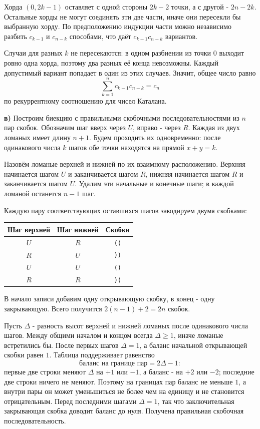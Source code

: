 \begin{problems}
\par Хорда $(0,2k-1)$ оставляет с одной стороны $2k-2$ точки, а с другой - $2n-2k$. Остальные хорды не могут соединять эти две части, иначе они пересекли бы выбранную хорду. По предположению индукции части можно независимо разбить $c_{k-1}$ и $c_{n-k}$ способами, что даёт $c_{k-1}c_{n-k}$ вариантов.
\par Случаи для разных $k$ не пересекаются: в одном разбиении из точки $0$ выходит ровно одна хорда, поэтому два разных её конца невозможны. Каждый допустимый вариант попадает в один из этих случаев. Значит, общее число равно
\[
\sum_{k=1}^{n}c_{k-1}c_{n-k}=c_n
\]
по рекуррентному соотношению для чисел Каталана.
\par\textbf{в)} Построим биекцию с правильными скобочными последовательностями из $n$ пар скобок. Обозначим шаг вверх через $U$, вправо - через $R$. Каждая из двух ломаных имеет длину $n+1$. Будем проходить их одновременно: после одинакового числа $k$ шагов обе точки находятся на прямой $x+y=k$.
\par Назовём ломаные верхней и нижней по их взаимному расположению. Верхняя начинается шагом $U$ и заканчивается шагом $R$, нижняя начинается шагом $R$ и заканчивается шагом $U$. Удалим эти начальные и конечные шаги; в каждой ломаной останется $n-1$ шаг.
\par Каждую пару соответствующих оставшихся шагов закодируем двумя скобками:
\begin{center}
\begin{tabular}{c|c|c}
Шаг верхней & Шаг нижней & Скобки\\\hline
$U$ & $R$ & \texttt{((}\\
$R$ & $U$ & \texttt{))}\\
$U$ & $U$ & \texttt{()}\\
$R$ & $R$ & \texttt{)(}
\end{tabular}
\end{center}
В начало записи добавим одну открывающую скобку, в конец - одну закрывающую. Всего получится $2(n-1)+2=2n$ скобок.
\par Пусть $\Delta$ - разность высот верхней и нижней ломаных после одинакового числа шагов. Между общими началом и концом всегда $\Delta\ge1$, иначе ломаные встретились бы. После первых шагов $\Delta=1$, а баланс начальной открывающей скобки равен $1$. Таблица поддерживает равенство
\[
\text{баланс на границе пар}=2\Delta-1:
\]
первые две строки меняют $\Delta$ на $+1$ или $-1$, а баланс - на $+2$ или $-2$; последние две строки ничего не меняют. Поэтому на границах пар баланс не меньше $1$, а внутри пары он может уменьшиться не более чем на единицу и не становится отрицательным. Перед последними шагами $\Delta=1$, так что заключительная закрывающая скобка доводит баланс до нуля. Получена правильная скобочная последовательность.

\end{problems}

